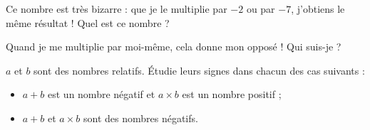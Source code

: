 \vspace{2em}

\begin{enigme}
Ce nombre est très bizarre : que je le multiplie par $-2$ ou par $-7$, j'obtiens le même résultat ! Quel est ce nombre ?

Quand je me multiplie par moi-même, cela donne mon opposé ! Qui suis-je ?
\end{enigme}



\vspace{2em}

\begin{enigme}
$a$ et $b$ sont des nombres relatifs. Étudie leurs signes dans chacun des cas suivants :
\begin{itemize}
    \item $a + b$ est un nombre négatif et $a \times b$ est un nombre positif ;
    \item $a + b$ et $a \times b$ sont des nombres négatifs.
\end{itemize}
\end{enigme}


\vspace{2em}

